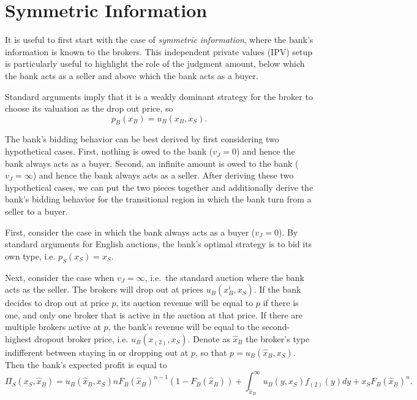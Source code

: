 \documentclass[11pt,twopage]{article}
\newtheorem{remark}{Remark}
{\bf}{\it}
\begin{document}
\section{Symmetric Information}
\label{sec:indep-priv-valu}

It is useful to first start with the case of \emph{symmetric
  information}, where the bank's information is known to the brokers.
This independent private values (IPV) setup is particularly useful to
highlight the role of the judgment amount, below which the bank acts
as a seller and above which the bank acts as a buyer.

Standard arguments imply that it is a weakly dominant strategy for the
broker to choose its valuation as the drop out price, so
\[p_B(x_B) = u_B(x_B,x_S).
\]


The bank's bidding behavior can be best derived by first considering
two hypothetical cases. First, nothing is owed to the bank ($v_J=0$)
and hence the bank always acts as a buyer. Second, an infinite amount
is owed to the bank ($v_J=\infty$) and hence the bank always acts as a
seller. After deriving these two hypothetical cases, we can put the
two pieces together and additionally derive the bank's bidding
behavior for the transitional region in which the bank turn from a
seller to a buyer.

First, consider the case in which the bank always acts as a buyer
($v_J=0$). By standard arguments for English auctions, the bank's
optimal strategy is to bid its own type, i.e. $p_S(x_S)=x_S$.

Next, consider the case when $v_J = \infty$, i.e.\ the standard
auction where the bank acts as the seller. The brokers will drop out
at prices $u_B(x_B^i,x_S)$. If the bank decides to drop out at price
$p$, its auction revenue will be equal to $p$ if there is one, and
only one broker that is active in the auction at that price. If there
are multiple brokers active at $p$, the bank's revenue will be equal
to the second-highest dropout broker price,
i.e. $u_B(x_{(2)},x_S)$. Denote as $\hat x_B$ the broker's type
indifferent between staying in or dropping out at $p$, so that $p =
u_B(\hat x_B, x_S)$. Then the bank's expected profit is equal to
\[ \Pi_S(x_S, \hat x_B) = u_B(\hat x_B,x_S) n F_B(\hat x_B)^{n-1}
(1-F_B(\hat x_B)) +\int_{\hat x_B}^\infty u_B(y,x_S) f_{(2)}(y) dy
+x_S F_B(\hat x_B)^n.
\]
\end{document}
